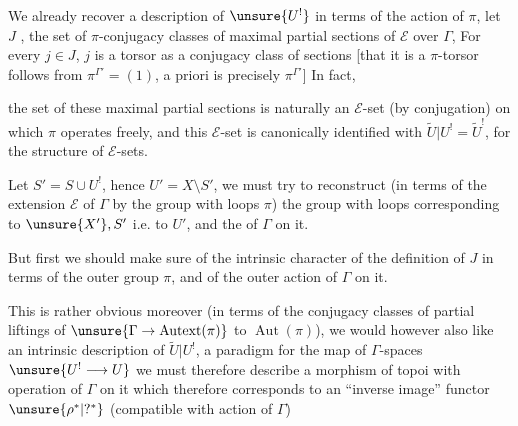 We already recover a description of \(\unsure{U^!}\) in terms of
the action of \(\pi\), let \(J\) ,
the set of \(\pi\)-conjugacy classes
of maximal partial sections  of
\(\mathcal E\) over \(\Gamma\),
For every \(j\in J\), \(j\) is a \inserted{\(\pi\)-}torsor
as a
\inserted{\(\pi\)-}conjugacy class of sections
[that it is a \(\pi\)-torsor follows from
\(\pi^{\Gamma'}=(1)\), a priori
is precisely \(\pi^{\Gamma'}\)]
In fact,



the set of  these  maximal partial
sections is naturally an \(\mathcal E\)-set
(by conjugation)  on which \(\pi\) operates freely, and this
\(\mathcal E\)-set is canonically identified with
\(\widetilde U|U^!=\widetilde U^!\), for the structure of
\(\mathcal E\)-sets.

Let \(S'=S\cup U^!\), hence \(U'=X\setminus S'\),
we must try to reconstruct
(in terms of the extension \(\mathcal E\) of \(\Gamma\) by the group with
loops \(\pi\)) the  group with loops corresponding
to \(\unsure{X'},S'\) i.e. to \(U'\), and the 
 of \(\Gamma\) on it.

But first we should make sure of the intrinsic character of the
definition of \(J\) 
in terms of the  
outer group \(\pi\), and of the outer action
 of \(\Gamma\) on it.



This is rather obvious moreover
(in terms  of the
\inserted{\(\pi\)-}conjugacy classes of partial liftings of
\(\unsure{\Gamma\to\operatorname{Autext}(\pi)}\) to
\(\operatorname{Aut}(\pi)\)), we would however also like an
intrinsic description of \(\widetilde U|U^!\),
 a paradigm for the map of
\(\Gamma\)-spaces \(\unsure{U^!\longrightarrow U}\)
we must therefore describe a morphism of topoi with operation of \(\Gamma\) on it
which therefore corresponds to an  
``inverse image'' functor \(\unsure{\rho^*|?^*}\)
(compatible with action of \(\Gamma\))

